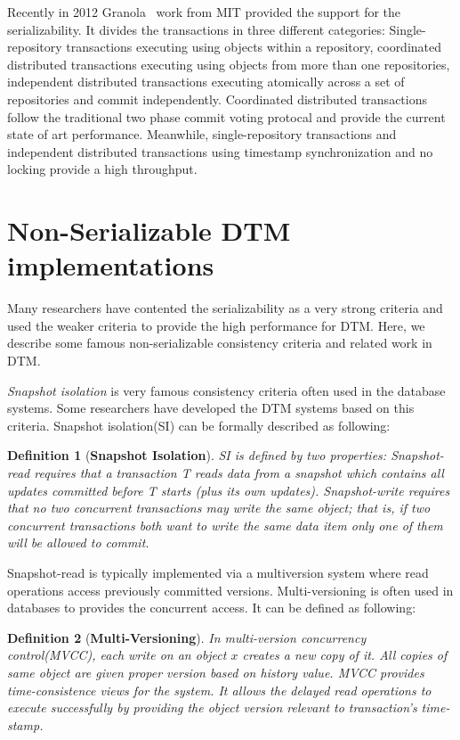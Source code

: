 \documentclass[12pt,english]{report}
\newtheorem{definition}{Definition}[section]
\begin{document}
Recently in 2012 Granola~\cite{cowling2012granola} work from MIT provided the support for the serializability. It divides the transactions in three different categories: Single-repository transactions executing using objects within a repository, coordinated distributed transactions executing using objects from more than one repositories, independent distributed transactions executing atomically across a set of repositories and commit independently. Coordinated distributed transactions follow the traditional two phase commit voting protocal and provide the current state of art performance. Meanwhile, single-repository transactions and independent distributed transactions using timestamp synchronization and no locking provide a high throughput.   

\section{Non-Serializable DTM implementations}

Many researchers have contented the serializability as a very strong criteria and used the weaker criteria to provide the high performance for DTM. Here, we describe some famous non-serializable consistency criteria and  related work in DTM. 

\textit{Snapshot isolation} is very famous consistency criteria often used in the database systems. Some researchers have developed the DTM systems based on this criteria. Snapshot isolation(SI) can be formally described as following:

\begin{definition}[\textbf{Snapshot Isolation}]
SI is defined by two properties: \textit{Snapshot-read} requires that a transaction T reads data from a snapshot which contains all updates committed before T starts (plus its own updates). \textit{Snapshot-write} requires that no two concurrent transactions may write the same object; that is, if two concurrent transactions both want to write the same data item only one of them will be allowed to commit.~\cite{SnapShot:Berenson:1995:CAS:223784.223785, SnapShot2:Lin:2009:SII:1538909.1538913}
\end{definition}

Snapshot-read is typically implemented via a multiversion system where read operations access previously committed versions. Multi-versioning is often used in databases to provides the concurrent access. It can be defined as following:
\begin{definition}[\textbf{Multi-Versioning}]
In multi-version concurrency control(MVCC), each write on an object $x$ creates a new copy of it. All copies of same object are given proper version based on history value. MVCC provides time-consistence views for the system. It allows the delayed read operations to execute successfully by providing the object version relevant to transaction's time-stamp. 
\end{definition}
\end{document}
